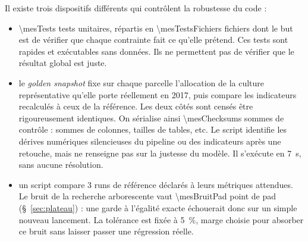 Il existe trois dispositifs différents qui contrôlent la robustesse du code :
\begin{itemize}
  \item \num{\mesTests} tests unitaires, répartis en \num{\mesTestsFichiers} fichiers dont le but
    est de vérifier que chaque contrainte fait ce qu'elle prétend. Ces tests sont rapides et
    exécutables sans données. Ils ne permettent pas de vérifier que le résultat global est juste.
  \item le \emph{golden snapshot} fixe sur chaque parcelle l'allocation de la culture
    représentative qu'elle porte réellement en \num{2017}, puis compare les indicateurs
    recalculés à ceux de la référence. Les deux côtés sont censés être rigoureusement
    identiques. On sérialise ainsi \num{\mesChecksums} sommes de contrôle : sommes de colonnes,
    tailles de tables, etc. Le script identifie les dérives numériques silencieuses du pipeline
    ou des indicateurs après une retouche, mais ne renseigne pas sur la justesse du modèle. Il
    s'exécute en \SI{7}{\second}, sans aucune résolution.
  \item un script compare \num{3} runs de référence déclarés à leurs métriques attendues. Le
    bruit de la recherche arborescente vaut \num{\mesBruitPad} point de \gls{pad}
    (§~\ref{sec:plateau}) : une garde à l'égalité exacte échouerait donc sur un simple
    nouveau lancement. La tolérance est fixée à \SI{5}{\percent}, marge choisie pour absorber ce
    bruit sans laisser passer une régression réelle.
\end{itemize}
